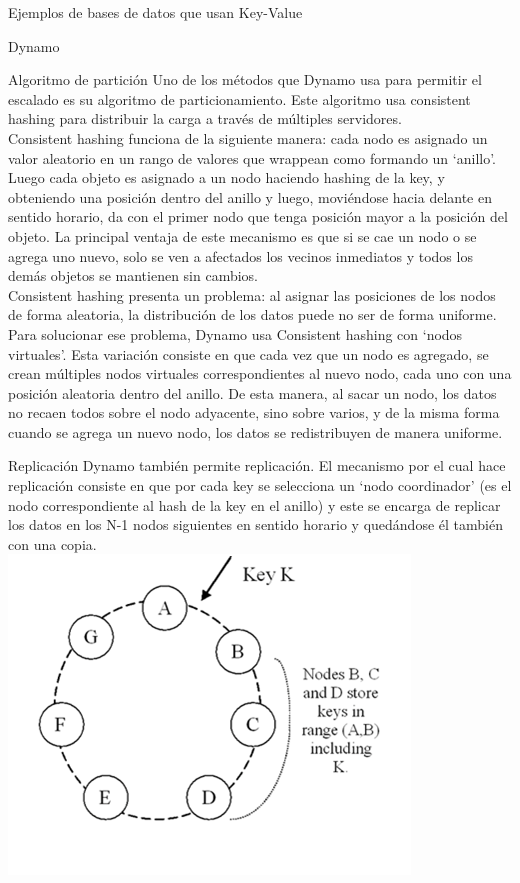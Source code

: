 \begin{section}{Ejemplos de bases de datos que usan Key-Value}
\begin{subsection}{Dynamo}
\begin{subsubsection}{Algoritmo de partición}
Uno de los métodos que Dynamo usa para permitir el escalado es su algoritmo de particionamiento. Este algoritmo usa consistent hashing para distribuir la carga a través de múltiples servidores. \\

	Consistent hashing funciona de la siguiente manera: cada nodo es asignado un valor aleatorio en un rango de valores que wrappean como formando un ‘anillo’. Luego cada objeto es asignado a un nodo haciendo hashing de la key, y obteniendo una posición dentro del anillo y luego, moviéndose hacia delante en sentido horario, da con el primer nodo que tenga posición mayor a la posición del objeto. La principal ventaja de este mecanismo es que si se cae un nodo o se agrega uno nuevo, solo se ven a afectados los vecinos inmediatos y todos los demás objetos se mantienen sin cambios.\\
	
	Consistent hashing presenta un problema: al asignar las posiciones de los nodos de forma aleatoria, la distribución de los datos puede no ser de forma uniforme. Para solucionar ese problema, Dynamo usa Consistent hashing con ‘nodos virtuales’. Esta variación consiste en que cada vez que un nodo es agregado, se crean múltiples nodos virtuales correspondientes al nuevo nodo, cada uno con una posición aleatoria dentro del anillo. De esta manera, al sacar un nodo, los datos no recaen todos sobre el nodo adyacente, sino sobre varios, y de la misma forma cuando se agrega un nuevo nodo, los datos se redistribuyen de manera uniforme.
	\\
\end{subsubsection}

\begin{subsubsection}{Replicación}
	Dynamo también permite replicación. El mecanismo por el cual hace replicación consiste en que por cada key se selecciona un ‘nodo coordinador’ (es el nodo correspondiente al hash de la key en el anillo) y este se encarga de replicar los datos en los N-1 nodos siguientes en sentido horario y quedándose él también con una copia.\\

\includegraphics[scale=1]{imgs/dynamo}
	

\end{subsubsection}
\end{subsection}
\end{section}

